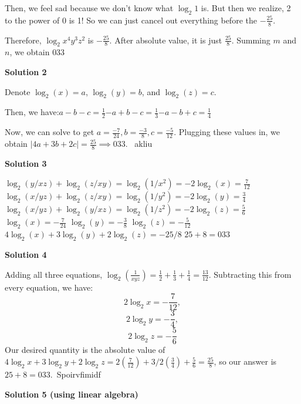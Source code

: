 \begin{enumerate}
 Then, we feel sad because we don’t know what $\log_2{1}$ is. But then we realize, 2 to the power of 0 is 1! So we can just cancel out everything before the $-\frac{25}{8}$. 

 Therefore, $\log_2{x^4y^3z^2}$ is $-\frac{25}{8}$. After absolute value, it is just $\frac{25}{8}$. Summing $m$ and $n$, we obtain $\boxed{033}$




\textbf{Solution 2}

Denote $\log_2(x) = a$, $\log_2(y) = b$, and $\log_2(z) = c$.

 Then, we have:$a-b-c = \frac{1}{2}$$-a+b-c = \frac{1}{3}$$-a-b+c = \frac{1}{4}$

 Now, we can solve to get $a = \frac{-7}{24}, b = \frac{-3}{8}, c = \frac{-5}{12}$. Plugging these values in, we obtain $|4a + 3b + 2c|  = \frac{25}{8} \implies \boxed{033}$. ~akliu

 



\textbf{Solution 3}

$\log_2(y/xz) + \log_2(z/xy) = \log_2(1/x^2) = -2\log_2(x) = \frac{7}{12}$
$\log_2(x/yz) + \log_2(z/xy) = \log_2(1/y^2) = -2\log_2(y) = \frac{3}{4}$
$\log_2(x/yz) + \log_2(y/xz) = \log_2(1/z^2) = -2\log_2(z) = \frac{5}{6}$
$\log_2(x) = -\frac{7}{24}$
$\log_2(y) = -\frac{3}{8}$
$\log_2(z) = -\frac{5}{12}$
$4\log_2(x) + 3\log_2(y) + 2\log_2(z) = -25/8$
$25 + 8 = \boxed{033}$




\textbf{Solution 4}

Adding all three equations, $\log_2(\frac{1}{xyz}) = \frac{1}{2}+\frac{1}{3}+\frac{1}{4} = \frac{13}{12}$. Subtracting this from every equation, we have: 
 \[2\log_2x = -\frac{7}{12},\] 
 \[2\log_2y = -\frac{3}{4},\] 
 \[2\log_2z = -\frac{5}{6}\] Our desired quantity is the absolute value of $4\log_2x+3\log_2y+2\log_2z = 2(\frac{7}{12})+3/2(\frac{3}{4})+\frac{5}{6} = \frac{25}{8}$, so our answer is $25+8 = \boxed{033}$.~Spoirvfimidf

 



\textbf{Solution 5 (using linear algebra)}


\end{enumerate}
